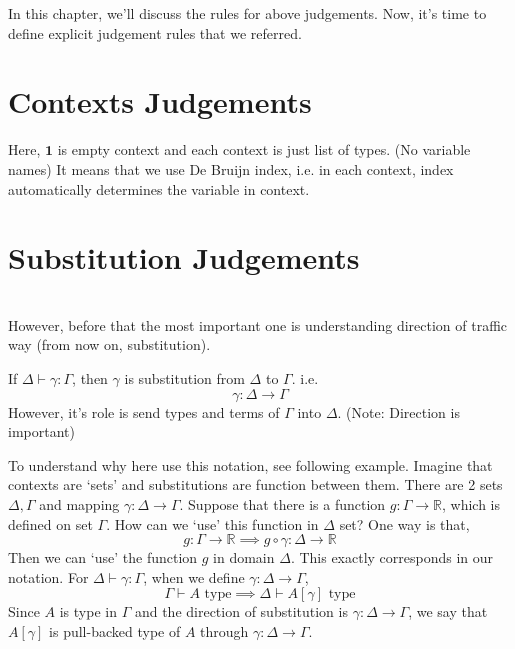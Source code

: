 \documentclass[12pt, a4paper, openany, twoside]{book}
\theoremstyle{definition}
\theoremstyle{remark}
\theoremstyle{plain}
\numberwithin{equation}{section}
\begin{document}
In this chapter, we'll discuss the rules for above judgements. 
Now, it's time to define explicit judgement rules that we referred. 
\newpage
\section{Contexts Judgements}
\begin{tcolorbox}[colback=yellow!10!white,colframe=green!75!black,title=Construction 1.2.1.]\label{cx judgement}
\end{tcolorbox}
Here, $\mathbf{1}$ is empty context and each context is just list of types. (No variable names) It means that 
we use De Bruijn index, i.e. in each context, index automatically determines the variable in context. 

\section{Substitution Judgements}\label{subst judgement} \quad \\

However, before that the most 
important one is understanding direction of traffic way (from now on, substitution). 

\begin{tcolorbox}[colback=yellow!10!white,colframe=blue!75!black,title=Definition 1.3.1.]\label{1.3.1}
    If $\Delta \vdash \gamma : \Gamma$, then $\gamma$ is substitution from $\Delta$ to $\Gamma$. i.e. 
    \[\gamma : \Delta \rightarrow \Gamma\]
    However, it's role is send types and terms of $\Gamma$ into $\Delta$. (Note: Direction is important)
\end{tcolorbox}

\begin{tcolorbox}[colback=yellow!10!white,colframe=red!75!black,title=1.3.  Intuitions for direction of substitutions]\label{intuition}
    To understand why here use this notation, see following example. Imagine that contexts are \lq sets' 
    and substitutions are function between them. There are 2 sets $\Delta, \Gamma$ and mapping $\gamma : \Delta \rightarrow \Gamma$. 
    Suppose that there is a function $g : \Gamma \rightarrow \mathbb{R}$, which is defined on set $\Gamma$. How can we 
    \lq use' this function in $\Delta$ set? One way is that, 
    \[g : \Gamma \rightarrow \mathbb{R} \implies g \circ \gamma : \Delta \rightarrow \mathbb{R}\]
    Then we can \lq use' the function $g$ in domain $\Delta$. This exactly corresponds in our notation. 
    For $\Delta \vdash \gamma : \Gamma$, when we define $\gamma : \Delta \rightarrow \Gamma$, 
    \[\Gamma \vdash A \text{ type} \implies \Delta \vdash A[\gamma] \text{ type}\]
    Since $A$ is type in $\Gamma$ and the direction of substitution is $\gamma : \Delta \rightarrow \Gamma$, we say that 
    $A[\gamma]$ is pull-backed type of $A$ through $\gamma : \Delta \rightarrow \Gamma$. 
\end{tcolorbox}
\end{document}

